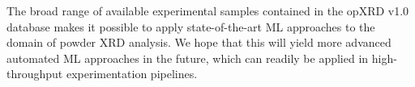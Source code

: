 The broad range of available experimental samples contained in the opXRD v1.0 database makes it possible to apply state-of-the-art ML approaches to the domain of powder XRD analysis.
We hope that this will yield more advanced automated ML approaches in the future, which can readily be applied in high-throughput experimentation pipelines.

